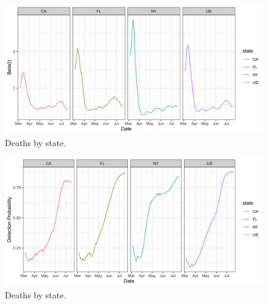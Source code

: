 \documentclass[11pt]{amsart}
\begin{document}
	
 \begin{figure}
     \centering
     \includegraphics[scale=.1]{beta_t_plot.png}
     \caption{Deaths by state. }
     \label{fig:my_label}
 \end{figure}
  \begin{figure}
     \centering
     \includegraphics[scale=.1]{detection_plot.png}
     \caption{Deaths by state. }
     \label{fig:my_label}
 \end{figure}
 
 
\end{document}
